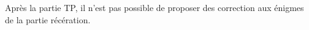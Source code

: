 Après la partie TP, il n'est pas possible de proposer des correction aux énigmes de la partie récération.


